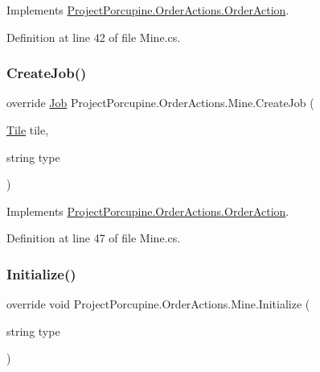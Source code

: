 Implements \hyperlink{class_project_porcupine_1_1_order_actions_1_1_order_action_a34bd9be15055adc6c5397db3aab7bc5f}{Project\+Porcupine.\+Order\+Actions.\+Order\+Action}.



Definition at line 42 of file Mine.\+cs.

\mbox{\label{class_project_porcupine_1_1_order_actions_1_1_mine_a77884a273e799b5203fecbb68884bf13}} 
\subsubsection{\texorpdfstring{Create\+Job()}{CreateJob()}}
{\footnotesize\ttfamily override \hyperlink{class_job}{Job} Project\+Porcupine.\+Order\+Actions.\+Mine.\+Create\+Job (\begin{DoxyParamCaption}\item[{\hyperlink{class_tile}{Tile}}]{tile,  }\item[{string}]{type }\end{DoxyParamCaption})\hspace{0.3cm}{\ttfamily [virtual]}}



Implements \hyperlink{class_project_porcupine_1_1_order_actions_1_1_order_action_a84f0d2817e07e351c4a9e86172d8f5b4}{Project\+Porcupine.\+Order\+Actions.\+Order\+Action}.



Definition at line 47 of file Mine.\+cs.

\mbox{\label{class_project_porcupine_1_1_order_actions_1_1_mine_a29675aa68437639392e77e821700b24e}} 
\subsubsection{\texorpdfstring{Initialize()}{Initialize()}}
{\footnotesize\ttfamily override void Project\+Porcupine.\+Order\+Actions.\+Mine.\+Initialize (\begin{DoxyParamCaption}\item[{string}]{type }\end{DoxyParamCaption})\hspace{0.3cm}{\ttfamily [virtual]}}




